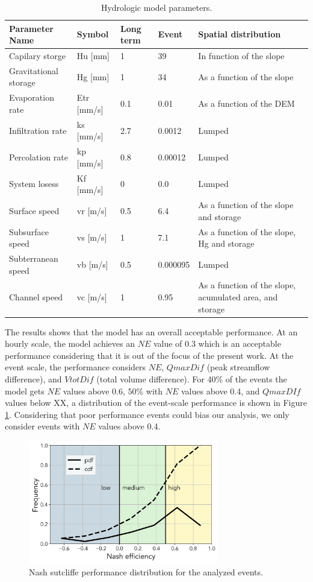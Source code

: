 \documentclass[preprint,12pt]{elsarticle}
\begin{document}
\begin{table}[]
        \centering
        \begin{tabularx}{\textwidth}{p{3cm} p{2.2cm} p{1.5cm} p{2cm} p{3.5cm}}
\hline
Parameter Name & Symbol & Long term & Event & Spatial distribution \\
\hline
Capilary storge & Hu [mm] & 1 & 39 & In function of the slope \\
Gravitational storage & Hg [mm] & 1 & 34 & As a function of the slope \\
Evaporation rate & Etr [mm/s] & 0.1 & 0.01 & As a function of the DEM \\
Infiltration rate & ks [mm/s] & 2.7 & 0.0012 & Lumped \\
Percolation rate & kp [mm/s] & 0.8 & 0.00012 & Lumped \\
System losess & Kf [mm/s] & 0 & 0.0 & Lumped \\
Surface speed & vr [m/s] & 0.5 & 6.4 & As a function of the slope and storage \\
Subsurface speed & vs [m/s] & 1 & 7.1 & As a function of the slope, Hg and storage\\
Subterranean speed & vb [m/s] & 0.5 & 0.000095 & Lumped \\
Channel speed & vc [m/s] & 1 & 0.95 & As a function of the slope, acumulated area, and storage \\
\hline
\end{tabularx}
        \caption{Hydrologic model parameters.}
        \label{tab:parameters}
    \end{table}

The results shows that the model has an overall acceptable performance.  At an hourly scale, the model achieves an $NE$ value of 0.3 which is an acceptable performance considering that it is out of the focus of the present work.  At the event scale, the performance considers $NE$, $QmaxDif$ (peak streamflow difference), and $VtotDif$ (total volume difference).  For 40\% of the events the model gets $NE$ values above 0.6, $50\%$ with $NE$ values above 0.4, and $QmaxDIf$ values below XX, a distribution of the event-scale performance is shown in Figure \ref{fig:performance}.  Considering that poor performance events could bias our analysis, we only consider events with $NE$ values above 0.4.\\

\begin{figure}[t]
    \centering
    \includegraphics[width=8.3cm]{Figuras/PerformNS_pdf.png}
    \caption{Nash sutcliffe performance distribution for the analyzed events.}
    \label{fig:performance}
\end{figure}
\end{document}

